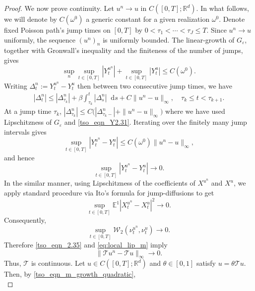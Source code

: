 \documentclass{article}
\newcommand*\der{\mathop{}\!\mathrm{d}}
\numberwithin{equation}{section}
\begin{document}
\begin{proof}
We now prove continuity.  Let $u^n\to u$ in
$C([0,T];\mathbb R^d)$. In what follows, we will denote by $C(\omega^0)$ a generic constant for a given realization $\omega^0$. Denote fixed Poisson path's jump times on $[0,T]$ by $0<\tau_1<\cdots<\tau_J\le T$. Since $u^n\to u$ uniformly, the
sequence $(u^n)_n$ is uniformly bounded. The linear-growth of $G_\varepsilon$, together with Gronwall's inequality and the finiteness of the number of jumps, gives
\begin{equation} \label{tso_eqn_Y2.31}
    \sup_n\sup_{t\in[0,T]}|Y_t^{u^n}|
    +     \sup_{t\in[0,T]}|Y_t^u|
    \leq C(\omega^0).
\end{equation}
 Writing $\Delta_t^n:=Y_t^{u^n}-Y_t^u$ then between two consecutive jump times, we have
\begin{align*}
    |\Delta_t^n|
    \leq |\Delta_{\tau_k}^n| + \beta\int_{\tau_k}^t|\Delta_s^n|\der s + C\|u^n-u\|_\infty, \quad \tau_k \leq t < \tau_{k+1}.
\end{align*}
At a jump time $\tau_k$, $|\Delta_{\tau_k}^n|
    \leq C\bigl(
        |\Delta_{\tau_k-}^n|
        + \|u^n-u\|_\infty \bigr)$ where we have used Lipschitzness of $G_\varepsilon$ and \eqref{tso_eqn_Y2.31}. Iterating over the finitely many jump intervals gives
\begin{equation*}
    \sup_{t\in[0,T]}|Y_t^{u^n}-Y_t^u|
    \leq     C(\omega^0)\|u^n-u\|_\infty,
\end{equation*}
and hence
\begin{equation*}
    \sup_{t\in[0,T]}|Y_t^{u^n}-Y_t^u|\to0.
\end{equation*}
In the similar manner, using Lipschitzness of the coefficients of  $X^{u^n}$ and $X^u$, we apply standard procedure via Ito's formula for jump-diffusions to get
\begin{equation*}
    \sup_{t\in[0,T]}
    \mathbb E^1|X_t^{u^n}-X_t^u|^2
    \to0.
\end{equation*}
Consequently,
\begin{equation} \label{tso_eqn_2.35}
    \sup_{t\in[0,T]}
    \mathcal W_2(\nu_t^{u^n},\nu_t^u)\rightarrow 0.
\end{equation}
 Therefore \eqref{tso_eqn_2.35} and \eqref{eq:local_lip_m} imply
\begin{equation*}
    \|\mathcal{T} u^n-\mathcal T u\|_\infty\to0.
\end{equation*}
Thus, $\mathcal T$ is continuous.
Let $u\in C([0,T];\mathbb R^d)$ and $\theta\in[0,1]$ satisfy $ u=\theta\mathcal{T} u$. Then, by \eqref{tso_eqn_m_growth_quadratic},
\begin{equation}

\end{equation}
\end{proof}
\end{document}
